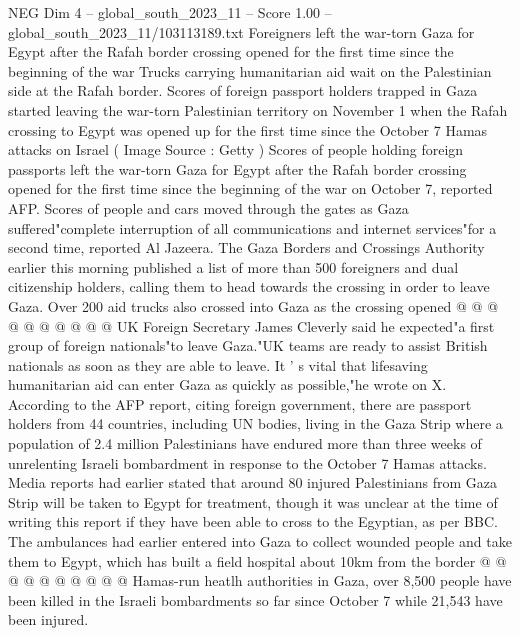 \begin{textsample}{NEG Dim 4 – global\_south\_2023\_11 – Score 1.00 – global\_south\_2023\_11/103113189.txt}  \label{ex:f4_neg_291}
Foreigners left the war-torn Gaza for Egypt after the Rafah border crossing opened for the first time since the beginning of the war Trucks carrying humanitarian aid wait on the Palestinian side at the Rafah border.
Scores of foreign passport holders trapped in Gaza started leaving the war-torn Palestinian territory on November 1 when the Rafah crossing to Egypt was opened up for the first time since the October 7 Hamas attacks on Israel ( Image Source : Getty ) Scores of people holding foreign passports left the war-torn Gaza for Egypt after the Rafah border crossing opened for the first time since the beginning of the war on October 7, reported AFP.
Scores of people and cars moved through the gates as Gaza suffered"complete interruption of all communications and internet services"for a second time, reported Al Jazeera.
The Gaza Borders and Crossings Authority earlier this morning published a list of more than 500 foreigners and dual citizenship holders, calling them to head towards the crossing in order to leave Gaza.
Over 200 aid trucks also crossed into Gaza as the crossing opened @ @ @ @ @ @ @ @ @ @ UK Foreign Secretary James Cleverly said he expected"a first group of foreign nationals"to leave Gaza."UK teams are ready to assist British nationals as soon as they are able to leave.
It ' s vital that lifesaving humanitarian aid can enter Gaza as quickly as possible,"he wrote on X.
According to the AFP report, citing foreign government, there are passport holders from 44 countries, including UN bodies, living in the Gaza Strip where a population of 2.4 million Palestinians have endured more than three weeks of unrelenting Israeli bombardment in response to the October 7 Hamas attacks.
Media reports had earlier stated that around 80 injured Palestinians from Gaza Strip will be taken to Egypt for treatment, though it was unclear at the time of writing this report if they have been able to cross to the Egyptian, as per BBC.
The ambulances had earlier entered into Gaza to collect wounded people and take them to Egypt, which has built a field hospital about 10km from the border @ @ @ @ @ @ @ @ @ @ Hamas-run heatlh authorities in Gaza, over 8,500 people have been killed in the Israeli bombardments so far since October 7 while 21,543 have been injured.

\end{textsample}
